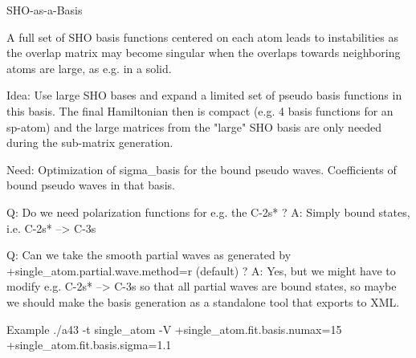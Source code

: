 SHO-as-a-Basis

A full set of SHO basis functions centered on each atom leads to instabilities 
as the overlap matrix may become singular when the overlaps towards neighboring atoms are large, as e.g. in a solid.

Idea: Use large SHO bases and expand a limited set of pseudo basis functions in this basis.
The final Hamiltonian then is compact (e.g. 4 basis functions for an sp-atom)
and the large matrices from the "large" SHO basis are only needed during the sub-matrix generation.

Need: Optimization of sigma_basis for the bound pseudo waves.
      Coefficients of bound pseudo waves in that basis.
      
Q: Do we need polarization functions for e.g. the C-2s* ?
A: Simply bound states, i.e. C-2s* --> C-3s

Q: Can we take the smooth partial waves as generated by +single_atom.partial.wave.method=r (default) ?
A: Yes, but we might have to modify e.g. C-2s* --> C-3s so that all partial waves are bound states,
   so maybe we should make the basis generation as a standalone tool that exports to XML.

Example
./a43 -t single_atom -V +single_atom.fit.basis.numax=15 +single_atom.fit.basis.sigma=1.1






